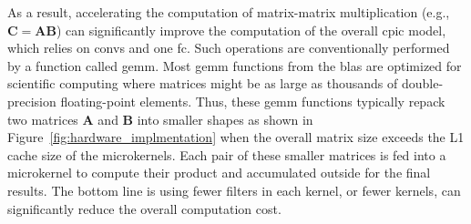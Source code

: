 \documentclass{article}
\begin{document}
As a result, accelerating the computation of matrix-matrix multiplication (e.g., $\bm C = \bm A \bm B$) can significantly improve the computation of the overall \gls{cpic} model, which relies on \glspl{conv} and one \gls{fc}.
Such operations are conventionally performed by a function called \gls{gemm}.
Most \gls{gemm} functions from the \gls{blas} are optimized for scientific computing where matrices might be as large as thousands of double-precision floating-point elements.
Thus, these \gls{gemm} functions typically repack two matrices $\bm A$ and  $\bm B$ into smaller shapes as shown in Figure~\ref{fig:hardware_implmentation} when the overall matrix size exceeds the L1 cache size of the microkernels.
Each pair of these smaller matrices is fed into a microkernel to compute their product and accumulated outside for the final results.
The bottom line is using fewer filters in each kernel, or fewer kernels, can significantly reduce the overall computation cost.
\end{document}
